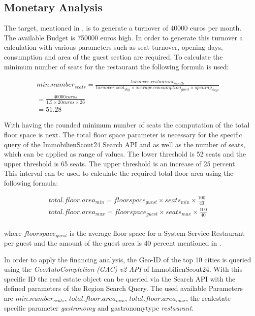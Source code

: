 \subsection{Monetary Analysis}
\label{subsec:moneten}
The target, mentioned in , is to generate a turnover of 40000 euros per month. The available Budget
 is 750000 euros high. In order to generate this turnover a calculation with various parameters such as seat turnover,
 opening days, consumption and area of the guest section are required. To calculate the minimum number of seats for the
 restaurant the following formula is used:
\begin{center}
\begin{equation}
\begin{aligned}
	min.number_{seats} = \frac{turnover.restaurant_{month}}{turnover.seat_{day} \times average.consumption_{guest} \times opening_{days}} \\
	= \frac{40000 euros}{1.5 \times 20 euros \times 26} \\
	= 51.28
\end{aligned}
\label{eq:number_seats_benchmark}
\end{equation}
\end{center}

With having the rounded minimum number of seats the computation of the total floor space is next. The total
 floor space parameter is necessary for the specific query of the ImmobilienScout24 Search API \cite{ImmoScout} and as
 well as the number of seats, which can be applied as range of values. The lower threshold is 52 seats and the upper
 threshold is 65 seats. The upper threshold is an increase of 25 percent. This interval can be used to calculate the
 required total floor area using the following formula:

\begin{equation}
\begin{aligned}
	total.floor.area_{min} = floorspace_{guest} \times seats_{min} \times \frac{100}{40} \\
	total.floor.area_{max} = floorspace_{guest} \times seats_{max} \times \frac{100}{40} \\
\end{aligned}
\label{eq:total_floor_space}
\end{equation}

where $floorspace_{guest}$ is the average floor space for a System-Service-Restaurant per guest \cite{FlaecheGast} and the
 amount of the guest area is 40 percent mentioned in \cite{FlaecheGastronomie}.

In order to apply the financing analysis, the Geo-ID of the top 10 cities is queried using the \textit{GeoAutoCompletion (GAC)
 v2 \ac{API}} of ImmobilienScout24. With this specific ID the real estate object can be queried via the Search \ac{API}
 with the defined parameters of the Region Search Query. The used available Parameters are $min.number_{seats}$, $total.floor.area_{min}$,
 $total.floor.area_{max}$, the realestate specific parameter \textit{gastronomy} and gastronomytype \textit{restaurant}.



